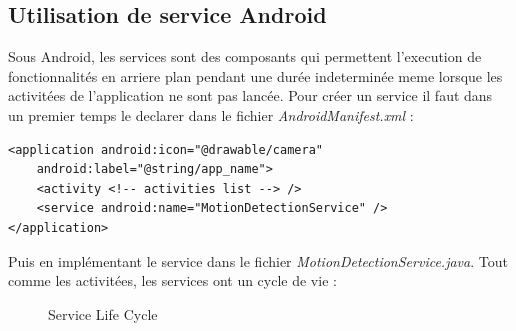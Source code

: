 \subsection{Utilisation de service Android}
Sous Android, les services sont des composants qui permettent l'execution de
fonctionnalités en arriere plan pendant une durée indeterminée meme lorsque les
activitées de l'application ne sont pas lancée.
Pour créer un service il faut dans un premier temps le declarer dans le fichier
\textit{AndroidManifest.xml} :\newline
\begin{lstlisting}[format=XML]
<application android:icon="@drawable/camera" 
	android:label="@string/app_name">
	<activity <!-- activities list --> />
	<service android:name="MotionDetectionService" />
</application>
\end{lstlisting}
Puis en implémentant le service dans le fichier
\textit{MotionDetectionService.java}.
 Tout comme les activitées, les services ont
un cycle de vie :
\newpage
\begin{center}
\begin{figure}
   \label{serviceLifecycle}
  \centering
   \caption{Service Life Cycle \protect\footnotemark}
  \end{figure}
  \end{center}

